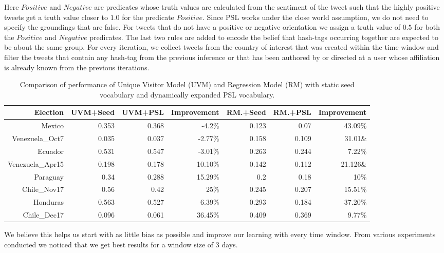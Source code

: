 Here $Positive$ and $Negative$ are predicates whose truth values are calculated from the sentiment of the tweet such that the highly positive tweets get a truth value closer to $1.0$ for the predicate $Positive$. 
Since PSL works under the close world assumption, we do not need to specify the groundings that are false.
For tweets that do not have a positive or negative orientation we assign a truth value of $0.5$ for both the $Positive$ and $Negative$ predicates.
The last two rules are added to encode the belief that hash-tags occurring together are expected to be about the same group.
For every iteration, we collect tweets from the country of interest that was created within the time window and filter the tweets that contain any hash-tag from the previous inference  or that has been authored by or directed at a user whose affiliation is already known from the previous iterations.
\begin{table}[Ht]
	\centering
	\begin{tabular}{| r || r | r | r | r | r | r |}
 	\hline
 	Election & UVM+Seed & UVM+PSL & Improvement & RM.+Seed & RM.+PSL & Improvement\\
 	\hline
	Mexico & 0.353 & 0.368 & -4.2\% & 0.123 & 0.07 & 43.09\% \\ 	
 	Venezuela\_Oct7 & 0.035	& 0.037 & -2.77\% & 0.158 & 0.109 & 31.01\&\\
	Ecuador & 0.531 & 0.547 & -3.01\% & 0.263 & 0.244 & 7.22\% \\
	Venezuela\_Apr15 & 0.198 & 0.178 & 10.10\% & 0.142 & 0.112 & 21.126\&\\
	Paraguay & 0.34 & 0.288 & 15.29\% & 0.2 & 0.18 & 10\% \\
	Chile\_Nov17 & 0.56 & 0.42 & 25\% & 0.245 & 0.207 & 15.51\% \\
	Honduras & 0.563 & 0.527 & 6.39\% & 0.293 & 0.184 & 37.20\% \\
	Chile\_Dec17 & 0.096 & 0.061 & 36.45\% & 0.409 & 0.369 & 9.77\% \\
 	\hline
	\end{tabular}
	\vspace{-0.5em}
	\caption{Comparison of performance of Unique Visitor Model (UVM) and Regression Model (RM) with static seed vocabulary and dynamically expanded  PSL vocabulary.}
	\label{table:improvement}
	\vspace{-0.5em}
\end{table}	
We believe this helps us start with as little bias as possible and improve our learning with every time window.
From various experiments conducted we noticed that we get best results for a window size of 3 days. 
